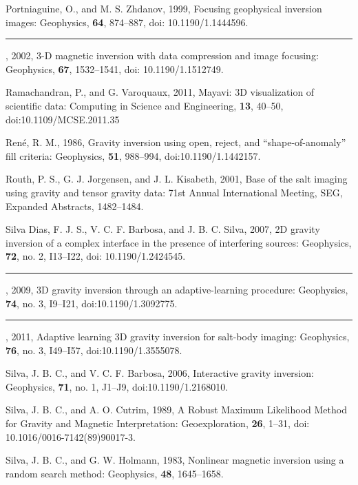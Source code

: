 \begin{thebibliography}{}
Portniaguine, O., and M. S. Zhdanov,  1999, Focusing geophysical inversion
    images: Geophysics, {\bf 64}, 874--887, doi: 10.1190/1.1444596.

\rule{1cm}{.4pt}, 2002, 3-D magnetic inversion with data compression and image focusing:
    Geophysics, {\bf 67}, 1532--1541, doi: 10.1190/1.1512749.

Ramachandran, P., and G. Varoquaux, 2011, Mayavi: 3D visualization of scientific
    data: Computing in Science and Engineering, {\bf 13}, 40–50,
    doi:10.1109/MCSE.2011.35
    
Ren\'e, R. M., 1986, Gravity inversion using open, reject, and
    ``shape-of-anomaly'' fill criteria: Geophysics, {\bf 51}, 988--994,
    doi:10.1190/1.1442157.

Routh, P. S., G. J. Jorgensen, and J. L. Kisabeth, 2001, Base of the salt
    imaging using gravity and tensor gravity data: 71st Annual International
    Meeting, SEG, Expanded Abstracts, 1482--1484.

Silva Dias, F. J. S., V. C. F. Barbosa, and J. B. C. Silva, 2007, 2D gravity
    inversion of a complex interface in the presence of interfering sources:
    Geophysics, {\bf 72}, no. 2, I13--I22, doi: 10.1190/1.2424545.

\rule{1cm}{.4pt}, 2009, 3D gravity inversion through an adaptive-learning procedure:
    Geophysics, {\bf 74}, no. 3, I9--I21, doi:10.1190/1.3092775.

\rule{1cm}{.4pt}, 2011, Adaptive learning 3D gravity inversion for salt-body imaging:
    Geophysics, {\bf 76}, no. 3, I49--I57, doi:10.1190/1.3555078.

Silva, J. B. C., and V. C. F. Barbosa, 2006, Interactive gravity inversion:
    Geophysics, {\bf 71}, no. 1, J1--J9, doi:10.1190/1.2168010.

Silva, J. B. C., and A. O. Cutrim, 1989, A Robust Maximum Likelihood Method for
    Gravity and Magnetic Interpretation: Geoexploration, {\bf 26}, 1--31,
    doi: 10.1016/0016-7142(89)90017-3. 

Silva, J. B. C., and G. W. Holmann, 1983, Nonlinear magnetic inversion using a
    random search method: Geophysics, {\bf 48}, 1645--1658.


\end{thebibliography}
